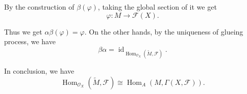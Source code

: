 \documentclass{article}
\numberwithin{equation}{section}
\DeclareMathOperator{\Hom}{Hom}
\DeclareMathOperator{\id}{id}
\begin{document}
By the construction of $\beta(\varphi)$, taking the global section of it we get 
\begin{equation*}
\varphi:M\to\mathscr{F}(X).
\end{equation*}

Thus we get $\alpha\beta(\varphi) = \varphi$. On the other hands, by the uniqueness of glueing process, we have 
\begin{equation*}
\beta\alpha = \id_{\Hom_{\mathcal{O}_X}(\tilde{M},\mathscr{F})}.
\end{equation*}

In conclusion, we have
\begin{equation*}
\Hom_{\mathcal{O}_X}(\tilde{M},\mathscr{F}) \cong\Hom_A(M,\Gamma(X,\mathscr{F})).
\end{equation*}
\end{document}
